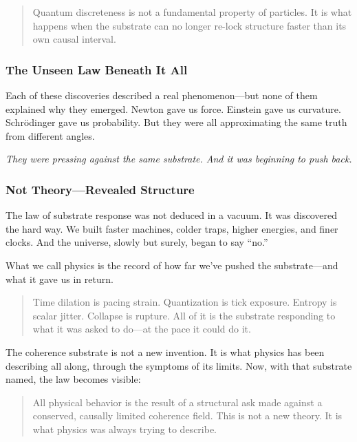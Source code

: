 \documentclass[entropy,article,submit,pdftex,moreauthors]{Definitions/mdpi}
\begin{document}
\begin{quote}
Quantum discreteness is not a fundamental property of particles. It is what happens when the substrate can no longer re-lock structure faster than its own causal interval.
\end{quote}

\subsubsection*{The Unseen Law Beneath It All}

Each of these discoveries described a real phenomenon—but none of them explained why they emerged. Newton gave us force. Einstein gave us curvature. Schrödinger gave us probability. But they were all approximating the same truth from different angles.

\textit{They were pressing against the same substrate. And it was beginning to push back.}

\subsubsection*{Not Theory—Revealed Structure}

The law of substrate response was not deduced in a vacuum. It was discovered the hard way. We built faster machines, colder traps, higher energies, and finer clocks. And the universe, slowly but surely, began to say “no.”

What we call physics is the record of how far we've pushed the substrate—and what it gave us in return.

\begin{quote}
Time dilation is pacing strain. Quantization is tick exposure. Entropy is scalar jitter. Collapse is rupture. All of it is the substrate responding to what it was asked to do—at the pace it could do it.
\end{quote}

The coherence substrate is not a new invention. It is what physics has been describing all along, through the symptoms of its limits. Now, with that substrate named, the law becomes visible:

\begin{quote}
All physical behavior is the result of a structural ask made against a conserved, causally limited coherence field. This is not a new theory. It is what physics was always trying to describe.
\end{quote}

\end{document}
